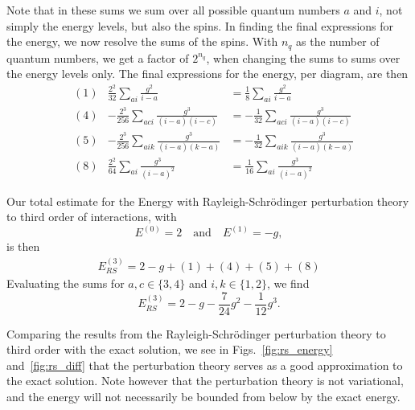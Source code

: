 Note that in these sums we sum over all possible quantum numbers $a$ and $i$, not simply the energy levels, but also the spins.
In finding the final expressions for the energy, we now resolve the sums of the spins.
With $n_q$ as the number of quantum numbers, we get a factor of $2^{n_q}$, when changing the sums to sums over the energy levels only.
The final expressions for the energy, per diagram, are then
\begin{align*}
    & (1) & \frac{2^2}{32} \sum_{ai} \frac{g^2}{i - a} &= \frac{1}{8} \sum_{ai} \frac{g^2}{i - a} \\
    & (4) & -\frac{2^3}{256} \sum_{aci} \frac{g^3}{(i-a)(i-c)} &= -\frac{1}{32} \sum_{aci} \frac{g^3}{(i-a)(i-c)} \\
    & (5) & -\frac{2^3}{256} \sum_{aik} \frac{g^3}{(i-a)(k-a)} &= -\frac{1}{32} \sum_{aik} \frac{g^3}{(i-a)(k-a)} \\
    & (8) & \frac{2^2}{64} \sum_{ai} \frac{g^3}{(i - a)^2} &= \frac{1}{16} \sum_{ai} \frac{g^3}{(i - a)^2} %
\end{align*}

Our total estimate for the Energy with Rayleigh-Schr\"odinger perturbation theory to third order of interactions, with
\begin{equation*}
    E^{(0)} = 2 \quad \text{and} \quad E^{(1)} = - g,
\end{equation*}
is then
\begin{align*}
    E_{RS}^{(3)} = 2 - g + (1) + (4) + (5) + (8)
\end{align*}
Evaluating the sums for $a,c \in \{3, 4\}$ and $i,k \in \{1, 2\}$, we find
\begin{equation*}
    E_{RS}^{(3)} %
    = 2 - g - \frac{7}{24} g^2 - \frac{1}{12} g^3.
\end{equation*}

Comparing the results from the Rayleigh-Schr\"odinger perturbation theory to third order with the exact solution, we see in Figs.~\ref{fig:rs_energy} and~\ref{fig:rs_diff} that the perturbation theory serves as a good approximation to the exact solution.
Note however that the perturbation theory is not variational, and the energy will not necessarily be bounded from below by the exact energy.

